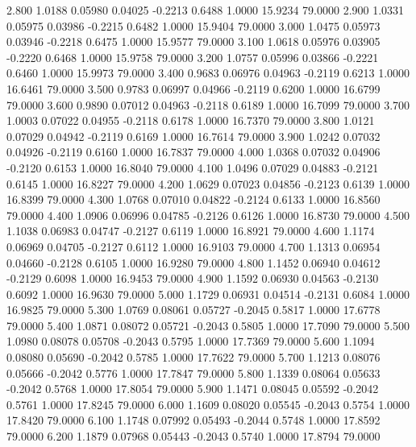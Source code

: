    2.800   1.0188   0.05980   0.04025  -0.2213   0.6488   1.0000  15.9234  79.0000
   2.900   1.0331   0.05975   0.03986  -0.2215   0.6482   1.0000  15.9404  79.0000
   3.000   1.0475   0.05973   0.03946  -0.2218   0.6475   1.0000  15.9577  79.0000
   3.100   1.0618   0.05976   0.03905  -0.2220   0.6468   1.0000  15.9758  79.0000
   3.200   1.0757   0.05996   0.03866  -0.2221   0.6460   1.0000  15.9973  79.0000
   3.400   0.9683   0.06976   0.04963  -0.2119   0.6213   1.0000  16.6461  79.0000
   3.500   0.9783   0.06997   0.04966  -0.2119   0.6200   1.0000  16.6799  79.0000
   3.600   0.9890   0.07012   0.04963  -0.2118   0.6189   1.0000  16.7099  79.0000
   3.700   1.0003   0.07022   0.04955  -0.2118   0.6178   1.0000  16.7370  79.0000
   3.800   1.0121   0.07029   0.04942  -0.2119   0.6169   1.0000  16.7614  79.0000
   3.900   1.0242   0.07032   0.04926  -0.2119   0.6160   1.0000  16.7837  79.0000
   4.000   1.0368   0.07032   0.04906  -0.2120   0.6153   1.0000  16.8040  79.0000
   4.100   1.0496   0.07029   0.04883  -0.2121   0.6145   1.0000  16.8227  79.0000
   4.200   1.0629   0.07023   0.04856  -0.2123   0.6139   1.0000  16.8399  79.0000
   4.300   1.0768   0.07010   0.04822  -0.2124   0.6133   1.0000  16.8560  79.0000
   4.400   1.0906   0.06996   0.04785  -0.2126   0.6126   1.0000  16.8730  79.0000
   4.500   1.1038   0.06983   0.04747  -0.2127   0.6119   1.0000  16.8921  79.0000
   4.600   1.1174   0.06969   0.04705  -0.2127   0.6112   1.0000  16.9103  79.0000
   4.700   1.1313   0.06954   0.04660  -0.2128   0.6105   1.0000  16.9280  79.0000
   4.800   1.1452   0.06940   0.04612  -0.2129   0.6098   1.0000  16.9453  79.0000
   4.900   1.1592   0.06930   0.04563  -0.2130   0.6092   1.0000  16.9630  79.0000
   5.000   1.1729   0.06931   0.04514  -0.2131   0.6084   1.0000  16.9825  79.0000
   5.300   1.0769   0.08061   0.05727  -0.2045   0.5817   1.0000  17.6778  79.0000
   5.400   1.0871   0.08072   0.05721  -0.2043   0.5805   1.0000  17.7090  79.0000
   5.500   1.0980   0.08078   0.05708  -0.2043   0.5795   1.0000  17.7369  79.0000
   5.600   1.1094   0.08080   0.05690  -0.2042   0.5785   1.0000  17.7622  79.0000
   5.700   1.1213   0.08076   0.05666  -0.2042   0.5776   1.0000  17.7847  79.0000
   5.800   1.1339   0.08064   0.05633  -0.2042   0.5768   1.0000  17.8054  79.0000
   5.900   1.1471   0.08045   0.05592  -0.2042   0.5761   1.0000  17.8245  79.0000
   6.000   1.1609   0.08020   0.05545  -0.2043   0.5754   1.0000  17.8420  79.0000
   6.100   1.1748   0.07992   0.05493  -0.2044   0.5748   1.0000  17.8592  79.0000
   6.200   1.1879   0.07968   0.05443  -0.2043   0.5740   1.0000  17.8794  79.0000
